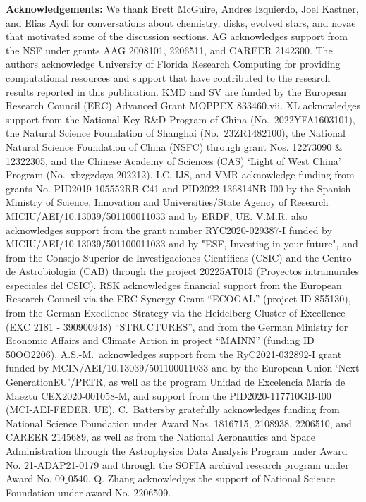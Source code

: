 \documentclass[]{aastex631}
\begin{document}
\vspace{1cm}

\textbf{Acknowledgements:}
We thank Brett McGuire, Andres Izquierdo, Joel Kastner, and Elias Aydi for conversations about chemistry, disks, evolved stars, and novae that motivated some of the discussion sections.
AG acknowledges support from the NSF under grants AAG 2008101, 2206511, and CAREER 2142300.
The authors acknowledge University of Florida Research Computing for providing computational resources and support that have contributed to the research results reported in this publication. 
KMD and SV are funded by the European Research Council (ERC) Advanced Grant MOPPEX 833460.vii.
XL acknowledges support from the National Key R\&D Program of China (No.\ 2022YFA1603101), the Natural Science Foundation of Shanghai (No.\ 23ZR1482100), the National Natural Science Foundation of China (NSFC) through grant Nos. 12273090 \& 12322305, and the Chinese Academy of Sciences (CAS) `Light of West China' Program (No.\ xbzgzdsys-202212). LC, IJS, and VMR acknowledge funding from grants No. PID2019-105552RB-C41 and PID2022-136814NB-I00 by the Spanish Ministry of Science, Innovation and Universities/State Agency of Research MICIU/AEI/10.13039/501100011033 and by ERDF, UE. V.M.R. also acknowledges support from the grant number RYC2020-029387-I funded by MICIU/AEI/10.13039/501100011033 and by "ESF, Investing in your future", and from the Consejo Superior de Investigaciones Cient{\'i}ficas (CSIC) and the Centro de Astrobiolog{\'i}a (CAB) through the project 20225AT015 (Proyectos intramurales especiales del CSIC).
RSK acknowledges financial support from the European Research Council via the ERC Synergy Grant ``ECOGAL'' (project ID 855130),  from the German Excellence Strategy via the Heidelberg Cluster of Excellence (EXC 2181 - 390900948) ``STRUCTURES'', and from the German Ministry for Economic Affairs and Climate Action in project ``MAINN'' (funding ID 50OO2206). 
A.S.-M.\ acknowledges support from the RyC2021-032892-I grant funded by MCIN/AEI/10.13039/501100011033 and by the European Union `Next GenerationEU’/PRTR, as well as the program Unidad de Excelencia María de Maeztu CEX2020-001058-M, and support from the PID2020-117710GB-I00 (MCI-AEI-FEDER, UE).
C.\ Battersby  gratefully  acknowledges  funding  from  National  Science  Foundation  under  Award  Nos. 1816715, 2108938, 2206510, and CAREER 2145689, as well as from the National Aeronautics and Space Administration through the Astrophysics Data Analysis Program under Award No. 21-ADAP21-0179 and through the SOFIA archival research program under Award No.  09$\_$0540.  
Q. Zhang acknowledges the support of National Science Foundation under award No. 2206509.
\end{document}
